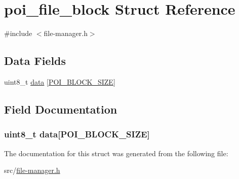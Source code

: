 \hypertarget{structpoi__file__block}{\section{poi\-\_\-file\-\_\-block Struct Reference}
\label{structpoi__file__block}
}


{\ttfamily \#include $<$file-\/manager.\-h$>$}

\subsection*{Data Fields}
\begin{DoxyCompactItemize}
\item 
uint8\-\_\-t \hyperlink{structpoi__file__block_a453580bb9858958a75d49cd9a450a4b3}{data} \mbox{[}\hyperlink{file-manager_8h_afb59af7070cf0cd010913eef940ffbbd}{P\-O\-I\-\_\-\-B\-L\-O\-C\-K\-\_\-\-S\-I\-Z\-E}\mbox{]}
\end{DoxyCompactItemize}


\subsection{Field Documentation}
\hypertarget{structpoi__file__block_a453580bb9858958a75d49cd9a450a4b3}{
\subsubsection[{data}]{\setlength{\rightskip}{0pt plus 5cm}uint8\-\_\-t data\mbox{[}{\bf P\-O\-I\-\_\-\-B\-L\-O\-C\-K\-\_\-\-S\-I\-Z\-E}\mbox{]}}}\label{structpoi__file__block_a453580bb9858958a75d49cd9a450a4b3}


The documentation for this struct was generated from the following file\-:\begin{DoxyCompactItemize}
\item 
src/\hyperlink{file-manager_8h}{file-\/manager.\-h}\end{DoxyCompactItemize}
